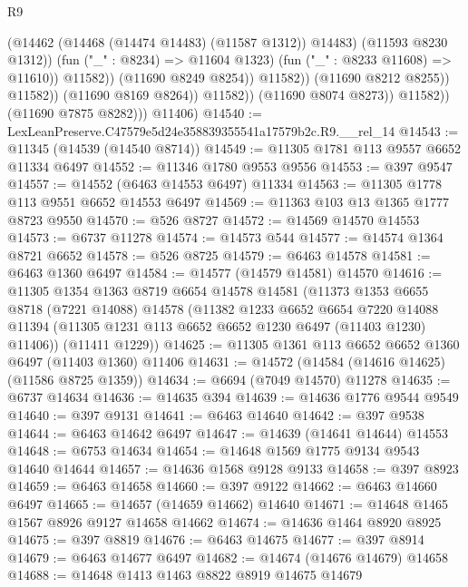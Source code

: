 \begin{lexlean}{R9}
\begin{coremodule}
                                          (@14462 (@14468 (@14474 @14483) (@11587 @1312)) @14483)
                                          (@11593 @8230 @1312))
                                        (fun ("_" : @8234) => @11604 @1323)
                                        (fun ("_" : @8233 @11608) => @11610))
                                      @11582))
                                  (@11690 @8249 @8254))
                                @11582))
                            (@11690 @8212 @8255))
                          @11582))
                      (@11690 @8169 @8264))
                    @11582))
                (@11690 @8074 @8273))
              @11582))
          (@11690 @7875 @8282)))
      @11406)
@14540 := LexLeanPreserve.C47579e5d24e358839355541a17579b2c.R9.__rel_14
@14543 := @11345 (@14539 (@14540 @8714))
@14549 := @11305 @1781 @113 @9557 @6652 @11334 @6497
@14552 := @11346 @1780 @9553 @9556
@14553 := @397 @9547
@14557 := @14552 (@6463 @14553 @6497) @11334
@14563 := @11305 @1778 @113 @9551 @6652 @14553 @6497
@14569 := @11363 @103 @13 @1365 @1777 @8723 @9550
@14570 := @526 @8727
@14572 := @14569 @14570 @14553
@14573 := @6737 @11278
@14574 := @14573 @544
@14577 := @14574 @1364 @8721 @6652
@14578 := @526 @8725
@14579 := @6463 @14578
@14581 := @6463 @1360 @6497
@14584 := @14577 (@14579 @14581) @14570
@14616 := @11305
    @1354
    @1363
    @8719
    @6654
    @14578
    @14581
    (@11373
      @1353
      @6655
      @8718
      (@7221 @14088)
      @14578
      (@11382
        @1233
        @6652
        @6654
        @7220
        @14088
        @11394
        (@11305 @1231 @113 @6652 @6652 @1230 @6497 (@11403 @1230) @11406))
      (@11411 @1229))
@14625 := @11305 @1361 @113 @6652 @6652 @1360 @6497 (@11403 @1360) @11406
@14631 := @14572 (@14584 (@14616 @14625) (@11586 @8725 @1359))
@14634 := @6694 (@7049 @14570) @11278
@14635 := @6737 @14634
@14636 := @14635 @394
@14639 := @14636 @1776 @9544 @9549
@14640 := @397 @9131
@14641 := @6463 @14640
@14642 := @397 @9538
@14644 := @6463 @14642 @6497
@14647 := @14639 (@14641 @14644) @14553
@14648 := @6753 @14634
@14654 := @14648 @1569 @1775 @9134 @9543 @14640 @14644
@14657 := @14636 @1568 @9128 @9133
@14658 := @397 @8923
@14659 := @6463 @14658
@14660 := @397 @9122
@14662 := @6463 @14660 @6497
@14665 := @14657 (@14659 @14662) @14640
@14671 := @14648 @1465 @1567 @8926 @9127 @14658 @14662
@14674 := @14636 @1464 @8920 @8925
@14675 := @397 @8819
@14676 := @6463 @14675
@14677 := @397 @8914
@14679 := @6463 @14677 @6497
@14682 := @14674 (@14676 @14679) @14658
@14688 := @14648 @1413 @1463 @8822 @8919 @14675 @14679

\end{coremodule}
\end{lexlean}
